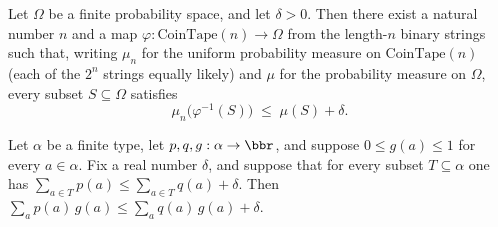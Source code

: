 \begin{theorem}
\label{CommunicationComplexity.Internal.single_coin_approx}
\leanok
{}
Let $\Omega$ be a finite probability space, and let $\delta > 0$. Then there exist a
natural number $n$ and a map $\varphi : \mathrm{CoinTape}(n) \to \Omega$ from the
length-$n$ binary strings such that, writing $\mu_n$ for the uniform probability measure
on $\mathrm{CoinTape}(n)$ (each of the $2^n$ strings equally likely) and $\mu$ for the
probability measure on $\Omega$, every subset $S \subseteq \Omega$ satisfies
\[
  \mu_n\bigl(\varphi^{-1}(S)\bigr) \;\le\; \mu(S) + \delta.
\]
\end{theorem}

\begin{lemma}
\label{CommunicationComplexity.Internal.weighted_sum_approx}
\leanok
{}
Let $\alpha$ be a finite type, let $p, q, g : \alpha \to \bbr$, and suppose $0 \le g(a)
\le 1$ for every $a \in \alpha$. Fix a real number $\delta$, and suppose that for every
subset $T \subseteq \alpha$ one has $\sum_{a \in T} p(a) \le \sum_{a \in T} q(a) +
\delta$. Then $\sum_{a} p(a)\,g(a) \le \sum_{a} q(a)\,g(a) + \delta$.
\end{lemma}

